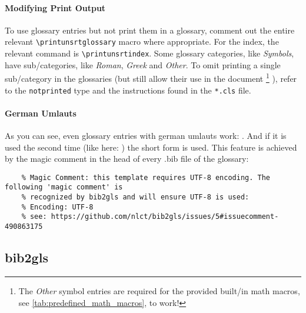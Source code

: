 
\paragraph{Modifying Print Output}
To use glossary entries but not print them in a glossary, comment out the entire
relevant \verb|\printunsrtglossary| macro where appropriate.
For the index, the relevant command is \verb|\printunsrtindex|.
Some glossary categories, like \emph{Symbols}, have sub\-/categories, like \emph{Roman},
\emph{Greek} and \emph{Other}.
To omit printing a single sub\-/category in the glossaries (but still allow their use
in the document%
\footnote{
    The \emph{Other} symbol entries are required for the provided built\-/in math
    macros, see \cref{tab:predefined_math_macros}, to work!%
}%
), refer to the \texttt{notprinted} type and the instructions found in the \texttt{*.cls}
file.

\paragraph{German Umlauts}
As you can see, even glossary entries with german umlauts work: .
And if it is used the second time (like here: ) the short form is used.
This feature is achieved by the magic comment in the head of every .bib file of the glossary:
\begin{verbatim}
    % Magic Comment: this template requires UTF-8 encoding. The following 'magic comment' is
    % recognized by bib2gls and will ensure UTF-8 is used:
    % Encoding: UTF-8
    % see: https://github.com/nlct/bib2gls/issues/5#issuecomment-490863175
\end{verbatim}

\subsection{bib2gls}
\label{ch:bib2gls}

